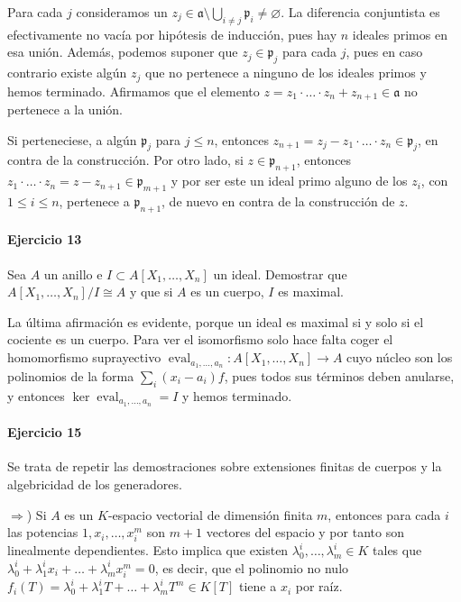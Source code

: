 \documentclass[../main.tex]{subfiles}
\begin{document}
Para cada $j$ consideramos un $z_j \in \mathfrak a \setminus \bigcup_{i\neq j} \mathfrak p_i \neq \varnothing$. La diferencia conjuntista es efectivamente no vacía por hipótesis de inducción, pues hay $n$ ideales primos en esa unión. Además, podemos suponer que $z_j \in \mathfrak p_j$ para cada $j$, pues en caso contrario existe algún $z_j$ que no pertenece a ninguno de los ideales primos y hemos terminado. Afirmamos que el elemento $z= z_1\cdot\ldots\cdot z_n + z_{n+1}\in \mathfrak a$ no pertenece a la unión.

Si perteneciese, a algún $\mathfrak p_j$ para $j\leq n$, entonces $z_{n+1} = z_j -z_1\cdot\ldots\cdot z_n  \in \mathfrak p_j $, en contra de la construcción. Por otro lado, si $z\in \mathfrak p_{n+1}$, entonces $z_1\cdot\ldots\cdot z_n = z-z_{n+1} \in \mathfrak p_{m+1}$ y por ser este un ideal primo alguno de los $z_i$, con $1 \leq i \leq n$, pertenece a $\mathfrak p_{n+1}$, de nuevo en contra de la construcción de $z$.

\paragraph{Ejercicio 13} Sea $A$ un anillo e $I\subset A[X_1,\ldots, X_n]$ un ideal. Demostrar que $A[X_1,\ldots, X_n]/I \cong A$ y que si $A$ es un cuerpo, $I$ es maximal.

La última afirmación es evidente, porque un ideal es maximal si y solo si el cociente es un cuerpo.  Para ver el isomorfismo solo hace falta coger el homomorfismo suprayectivo $\operatorname{eval}_{a_1,\ldots, a_n}:A[X_1,\ldots,X_n]\to A$ cuyo núcleo son los polinomios de la forma $\sum_i (x_i-a_i)f$, pues todos sus términos deben anularse, y entonces $\ker \operatorname{eval}_{a_1,\ldots, a_n} = I$ y hemos terminado.

\paragraph{Ejercicio 15}

Se trata de repetir las demostraciones sobre extensiones finitas de cuerpos y la algebricidad de los generadores.

$\Rightarrow$) Si $A$ es un $K$-espacio vectorial de dimensión finita $m$, entonces para cada $i$ las potencias $1, x_i, \ldots, x_i^m$ son $m+1$ vectores del espacio y por tanto son linealmente dependientes. Esto implica que existen $\lambda^i_0, \dots, \lambda^i_m \in K$ tales que $\lambda^i_0 + \lambda^i_1x_i + \ldots+\lambda^i_mx_i^m = 0$, es decir, que el polinomio no nulo $f_i(T) = \lambda^i_0 + \lambda^i_1 T + \ldots+\lambda^i_m T^m \in K[T]$ tiene a $x_i$ por raíz.
\end{document}
